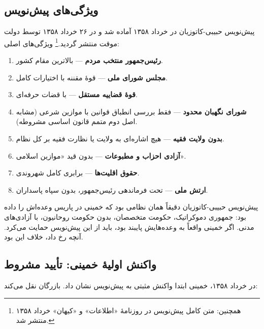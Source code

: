 \subsection{ویژگی‌های پیش‌نویس}

پیش‌نویس حبیبی-کاتوزیان در خرداد ۱۳۵۸ آماده شد و در ۲۶ خرداد ۱۳۵۸ توسط دولت موقت منتشر گردید.\footnote{ همچنین:  متن کامل پیش‌نویس در روزنامهٔ «اطلاعات» و «کیهان» خرداد ۱۳۵۸ منتشر شد.} ویژگی‌های اصلی:

\begin{principleBox}
\begin{enumerate}[label=\textcolor{cPrimary}{\bfseries\arabic*.}, rightmargin=2em]
    \item \textbf{رئیس‌جمهور منتخب مردم} — بالاترین مقام کشور.
    \item \textbf{مجلس شورای ملی} — قوهٔ مقننه با اختیارات کامل.
    \item \textbf{قوهٔ قضاییه مستقل} — با قضات حرفه‌ای.
    \item \textbf{شورای نگهبان محدود} — فقط بررسی انطباق قوانین با موازین شرعی (مشابه اصل دوم متمم قانون اساسی مشروطه).
    \item \textbf{بدون ولایت فقیه} — هیچ اشاره‌ای به ولایت یا نظارت فقیه بر کل نظام.
    \item \textbf{آزادی احزاب و مطبوعات} — بدون قید «موازین اسلامی».
    \item \textbf{حقوق اقلیت‌ها} — برابری کامل شهروندی.
    \item \textbf{ارتش ملی} — تحت فرماندهی رئیس‌جمهور، بدون سپاه پاسداران.
\end{enumerate}
\end{principleBox}

\begin{noteBox}
پیش‌نویس حبیبی-کاتوزیان دقیقاً همان نظامی بود که خمینی در پاریس وعده‌اش را داده بود: جمهوری دموکراتیک، حکومت متخصصان، بدون حکومت روحانیون، با آزادی‌های مدنی. اگر خمینی واقعاً به وعده‌هایش پایبند بود، باید از این پیش‌نویس حمایت می‌کرد. آنچه رخ داد، خلاف این بود.
\end{noteBox}

\subsection{واکنش اولیهٔ خمینی: تأیید مشروط}

در خرداد ۱۳۵۸، خمینی ابتدا واکنش مثبتی به پیش‌نویس نشان داد. بازرگان نقل می‌کند:

